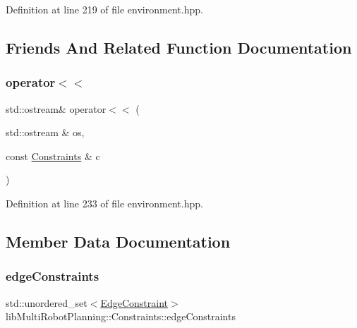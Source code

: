 Definition at line 219 of file environment.\+hpp.



\subsection{Friends And Related Function Documentation}
\mbox{\label{structlib_multi_robot_planning_1_1_constraints_a609a032077973e41f300c88a62d8f6fa}} 
\subsubsection{\texorpdfstring{operator$<$$<$}{operator<<}}
{\footnotesize\ttfamily std\+::ostream\& operator$<$$<$ (\begin{DoxyParamCaption}\item[{std\+::ostream \&}]{os,  }\item[{const \hyperlink{structlib_multi_robot_planning_1_1_constraints}{Constraints} \&}]{c }\end{DoxyParamCaption})\hspace{0.3cm}{\ttfamily [friend]}}



Definition at line 233 of file environment.\+hpp.



\subsection{Member Data Documentation}
\mbox{\label{structlib_multi_robot_planning_1_1_constraints_aec17e4c178b74398a68c1ad9a5d866b4}} 
\subsubsection{\texorpdfstring{edge\+Constraints}{edgeConstraints}}
{\footnotesize\ttfamily std\+::unordered\+\_\+set$<$\hyperlink{structlib_multi_robot_planning_1_1_edge_constraint}{Edge\+Constraint}$>$ lib\+Multi\+Robot\+Planning\+::\+Constraints\+::edge\+Constraints}



